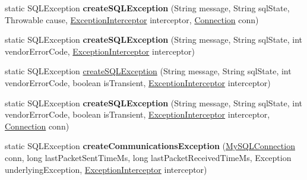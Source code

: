\begin{DoxyCompactItemize}
\item 
\mbox{\label{classcom_1_1mysql_1_1jdbc_1_1_s_q_l_error_a570b5a545db92c3105c4075c249ce9a7}} 
static S\+Q\+L\+Exception {\bfseries create\+S\+Q\+L\+Exception} (String message, String sql\+State, Throwable cause, \mbox{\hyperlink{interfacecom_1_1mysql_1_1jdbc_1_1_exception_interceptor}{Exception\+Interceptor}} interceptor, \mbox{\hyperlink{interfacecom_1_1mysql_1_1jdbc_1_1_connection}{Connection}} conn)
\item 
\mbox{\label{classcom_1_1mysql_1_1jdbc_1_1_s_q_l_error_ad2aec0b2a5048de7b254f571ef7c9a1c}} 
static S\+Q\+L\+Exception {\bfseries create\+S\+Q\+L\+Exception} (String message, String sql\+State, int vendor\+Error\+Code, \mbox{\hyperlink{interfacecom_1_1mysql_1_1jdbc_1_1_exception_interceptor}{Exception\+Interceptor}} interceptor)
\item 
static S\+Q\+L\+Exception \mbox{\hyperlink{classcom_1_1mysql_1_1jdbc_1_1_s_q_l_error_a96599f9d0d0c05759c4ff17ac20df4eb}{create\+S\+Q\+L\+Exception}} (String message, String sql\+State, int vendor\+Error\+Code, boolean is\+Transient, \mbox{\hyperlink{interfacecom_1_1mysql_1_1jdbc_1_1_exception_interceptor}{Exception\+Interceptor}} interceptor)
\item 
\mbox{\label{classcom_1_1mysql_1_1jdbc_1_1_s_q_l_error_a1161dfd38df2f8979c464796e4889636}} 
static S\+Q\+L\+Exception {\bfseries create\+S\+Q\+L\+Exception} (String message, String sql\+State, int vendor\+Error\+Code, boolean is\+Transient, \mbox{\hyperlink{interfacecom_1_1mysql_1_1jdbc_1_1_exception_interceptor}{Exception\+Interceptor}} interceptor, \mbox{\hyperlink{interfacecom_1_1mysql_1_1jdbc_1_1_connection}{Connection}} conn)
\item 
\mbox{\label{classcom_1_1mysql_1_1jdbc_1_1_s_q_l_error_a123d55898567e8123828e00374f138e0}} 
static S\+Q\+L\+Exception {\bfseries create\+Communications\+Exception} (\mbox{\hyperlink{interfacecom_1_1mysql_1_1jdbc_1_1_my_s_q_l_connection}{My\+S\+Q\+L\+Connection}} conn, long last\+Packet\+Sent\+Time\+Ms, long last\+Packet\+Received\+Time\+Ms, Exception underlying\+Exception, \mbox{\hyperlink{interfacecom_1_1mysql_1_1jdbc_1_1_exception_interceptor}{Exception\+Interceptor}} interceptor)
\item 

\end{DoxyCompactItemize}
